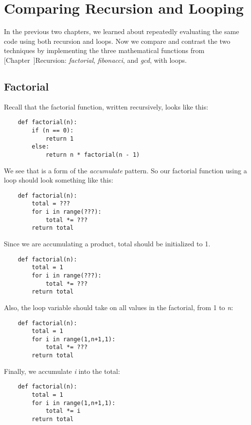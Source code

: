 \chapter{Comparing Recursion and Looping}
\label{RecursionLoop}

In the previous two chapters, we learned about repeatedly
evaluating the same code using both recursion and loops.
Now we compare and contrast the two techniques by
implementing the three mathematical functions from
[Chapter~\Ref]{Recursion}:
{\it factorial}, {\it fibonacci}, and {\it gcd}, with loops.

\section{Factorial}

Recall that the factorial function, written recursively,
looks like this:

\begin{verbatim}
    def factorial(n):
        if (n == 0):
            return 1
        else:
            return n * factorial(n - 1)
\end{verbatim}

We see that is a form of the {\it accumulate} pattern. So our factorial
function using a loop should look something like this:

\begin{verbatim}
    def factorial(n):
        total = ???
        for i in range(???):
            total *= ???
        return total
\end{verbatim}

Since we are accumulating a product, total should
be initialized to 1.

\begin{verbatim}
    def factorial(n):
        total = 1
        for i in range(???):
            total *= ???
        return total
\end{verbatim}

Also, the loop variable should take on all values in
the factorial, from 1 to {\it n}:

\begin{verbatim}
    def factorial(n):
        total = 1
        for i in range(1,n+1,1):
            total *= ???
        return total
\end{verbatim}

Finally, we accumulate {\it i} into the total:

\begin{verbatim}
    def factorial(n):
        total = 1
        for i in range(1,n+1,1):
            total *= i
        return total
\end{verbatim}

